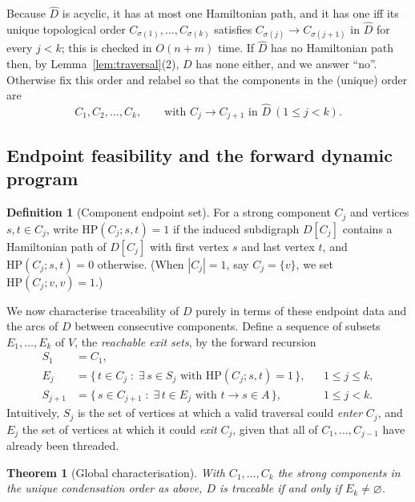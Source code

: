 \documentclass[12pt]{article}
\newtheorem{theorem}{Theorem}
\theoremstyle{definition}
\newtheorem{definition}{Definition}
\newcommand{\Vv}{V}
\newcommand{\Aa}{A}
\begin{document}
Because $\widehat D$ is acyclic, it has at most one Hamiltonian path, and it has
one iff its unique topological order $C_{\sigma(1)},\dots,C_{\sigma(k)}$ satisfies
$C_{\sigma(j)}\to C_{\sigma(j+1)}$ in $\widehat D$ for every $j<k$; this is checked
in $O(n+m)$ time. If $\widehat D$ has no Hamiltonian path then, by
Lemma~\ref{lem:traversal}(2), $D$ has none either, and we answer ``no''. Otherwise
fix this order and relabel so that the components in the (unique) order are
\[
C_{1},C_{2},\dots,C_{k},\qquad\text{with }C_{j}\to C_{j+1}\text{ in }\widehat D\ (1\le j<k).
\]

\subsection{Endpoint feasibility and the forward dynamic program}

\begin{definition}[Component endpoint set]\label{def:HP}
For a strong component $C_{j}$ and vertices $s,t\in C_{j}$, write
$\mathrm{HP}(C_{j};s,t)=1$ if the induced subdigraph $D[C_{j}]$ contains a
Hamiltonian path of $D[C_{j}]$ with first vertex $s$ and last vertex $t$, and
$\mathrm{HP}(C_{j};s,t)=0$ otherwise. (When $|C_{j}|=1$, say $C_{j}=\{v\}$, we set
$\mathrm{HP}(C_{j};v,v)=1$.)
\end{definition}

We now characterise traceability of $D$ purely in terms of these endpoint data and
the arcs of $D$ between consecutive components. Define a sequence of subsets
$E_{1},\dots,E_{k}$ of $\Vv$, the \emph{reachable exit sets}, by the forward
recursion
\begin{align}
S_{1} &= C_{1}, \label{eq:S1}\\
E_{j} &= \{\,t\in C_{j}\;:\;\exists\, s\in S_{j}\text{ with }
            \mathrm{HP}(C_{j};s,t)=1\,\}, &&1\le j\le k, \label{eq:Ej}\\
S_{j+1} &= \{\,s\in C_{j+1}\;:\;\exists\, t\in E_{j}\text{ with } t\to s\in \Aa\,\},
            &&1\le j<k. \label{eq:Sj}
\end{align}
Intuitively, $S_{j}$ is the set of vertices at which a valid traversal could
\emph{enter} $C_{j}$, and $E_{j}$ the set of vertices at which it could \emph{exit}
$C_{j}$, given that all of $C_{1},\dots,C_{j-1}$ have already been threaded.

\begin{theorem}[Global characterisation]\label{thm:global}
With $C_{1},\dots,C_{k}$ the strong components in the unique condensation order as
above, $D$ is traceable if and only if $E_{k}\neq\varnothing$.
\end{theorem}
\end{document}
